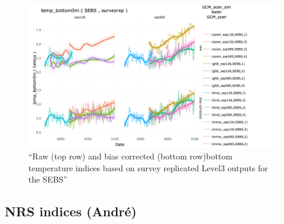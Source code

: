\documentclass[
]{article}
\begin{document}
\begin{figure}
\centering
\includegraphics[width=1\textwidth,height=\textheight]{Figs/biascorrected_temp2.png}
\caption{``Raw (top row) and bias corrected (bottom row)bottom
temperature indices based on survey replicated Level3 outputs for the
SEBS''}
\end{figure}

\hypertarget{nrs-indices-andruxe9}{%
\subsection{NRS indices (André)}\label{nrs-indices-andruxe9}}
\end{document}

